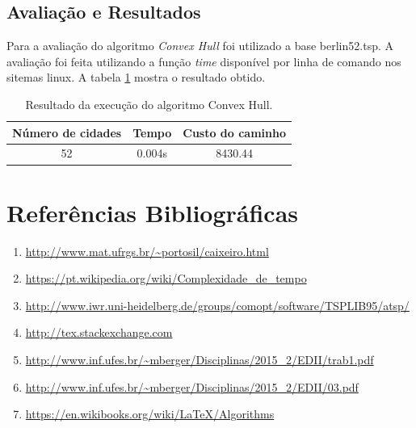 \documentclass[a4paper,12pt]{article}
\begin{document}
\subsection{Avaliação e Resultados}
Para a avaliação do algoritmo \emph{Convex Hull} foi utilizado a base berlin52.tsp.
A avaliação foi feita utilizando a função \emph{time} disponível por linha de comando nos sitemas linux.
A tabela \ref{TabelaCH} mostra o resultado obtido.

\begin{table}[H]
\centering
\caption{Resultado da execução do algoritmo Convex Hull.} \label{TabelaCH}
\begin{tabular}{ccc}
\hline
Número de cidades & Tempo & Custo do caminho \\
\hline
52       & 0.004s    & 8430.44      \\
\hline
\end{tabular}
\end{table}





\section{Referências Bibliográficas}
\begin{enumerate}
\item \url{http://www.mat.ufrgs.br/~portosil/caixeiro.html}
\item \url{https://pt.wikipedia.org/wiki/Complexidade_de_tempo}
\item \url{http://www.iwr.uni-heidelberg.de/groups/comopt/software/TSPLIB95/atsp/}
\item \url{http://tex.stackexchange.com} 
\item \url{http://www.inf.ufes.br/~mberger/Disciplinas/2015_2/EDII/trab1.pdf}
\item \url{http://www.inf.ufes.br/~mberger/Disciplinas/2015_2/EDII/03.pdf}
\item \url{https://en.wikibooks.org/wiki/LaTeX/Algorithms}
\end{enumerate}
\end{document}
